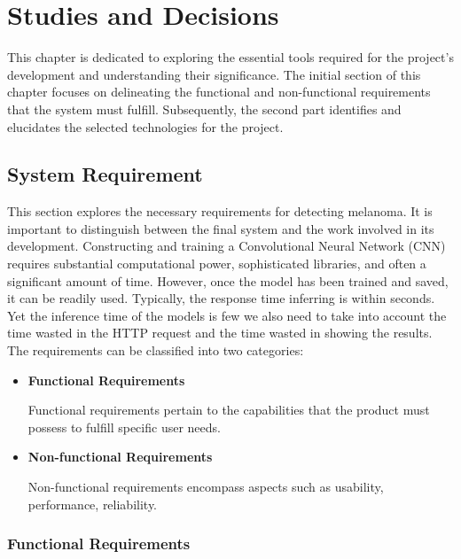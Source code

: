 \chapter{Studies and Decisions}
\label{cap:studies_and_decisions}

This chapter is dedicated to exploring the essential tools required for the project's development and understanding their significance. The initial section of this chapter focuses on delineating the functional and non-functional requirements that the system must fulfill. Subsequently, the second part identifies and elucidates the selected technologies for the project.

\section{System Requirement}

This section explores the necessary requirements for detecting melanoma. It is important to distinguish between the final system and the work involved in its development. Constructing and training a Convolutional Neural Network (CNN) requires substantial computational power, sophisticated libraries, and often a significant amount of time. However, once the model has been trained and saved, it can be readily used. Typically, the response time inferring is within seconds. Yet the inference time of the models is few we also need to take into account the time wasted in the HTTP request and the time wasted in showing the results. \\

The requirements can be classified into two categories:

\begin{itemize}
    \item \textbf{Functional Requirements}

    Functional requirements pertain to the capabilities that the product must possess to fulfill specific user needs.

    \item \textbf{Non-functional Requirements}

    Non-functional requirements encompass aspects such as usability, performance, reliability.
\end{itemize}

\newpage

\subsection{Functional Requirements}

